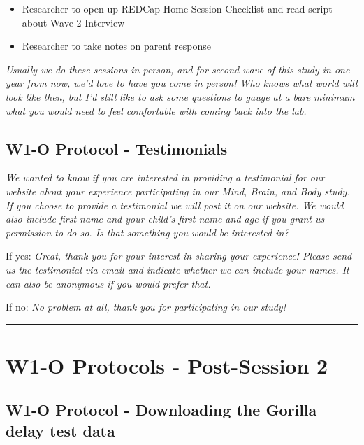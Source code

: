 \documentclass[
]{book}
\providecommand{\tightlist}{%
  \setlength{\itemsep}{0pt}\setlength{\parskip}{0pt}}
\begin{document}
\begin{itemize}
\tightlist
\item
  Researcher to open up REDCap Home Session Checklist and read script about Wave 2 Interview
\item
  Researcher to take notes on parent response
\end{itemize}

\emph{Usually we do these sessions in person, and for second wave of this study in one year from now, we'd love to have you come in person! Who knows what world will look like then, but I'd still like to ask some questions to gauge at a bare minimum what you would need to feel comfortable with coming back into the lab.}

\hypertarget{w1-o-protocol---testimonials}{%
\subsection{W1-O Protocol - Testimonials}\label{w1-o-protocol---testimonials}}

\emph{We wanted to know if you are interested in providing a testimonial for our website about your experience participating in our Mind, Brain, and Body study. If you choose to provide a testimonial we will post it on our website. We would also include first name and your child's first name and age if you grant us permission to do so. Is that something you would be interested in?}

If yes: \emph{Great, thank you for your interest in sharing your experience! Please send us the testimonial via email and indicate whether we can include your names. It can also be anonymous if you would prefer that.}

If no: \emph{No problem at all, thank you for participating in our study!}

\begin{center}\rule{0.5\linewidth}{0.5pt}\end{center}

\hypertarget{w1-o-protocols---post-session-2}{%
\section{W1-O Protocols - Post-Session 2}\label{w1-o-protocols---post-session-2}}

\hypertarget{w1-o-protocol---downloading-the-gorilla-delay-test-data}{%
\subsection{W1-O Protocol - Downloading the Gorilla delay test data}\label{w1-o-protocol---downloading-the-gorilla-delay-test-data}}
\end{document}
